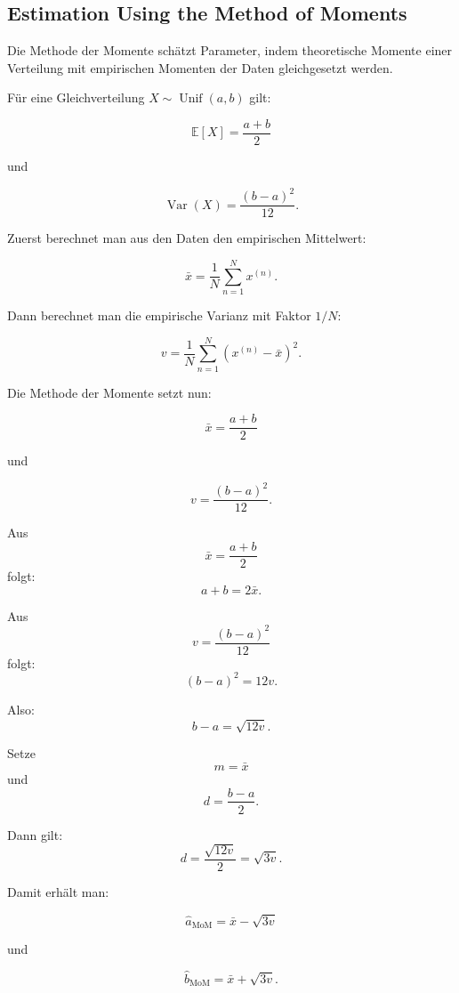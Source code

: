 \documentclass[11pt,a4paper]{scrartcl}
\begin{document}
\subsection{Estimation Using the Method of Moments}

\begin{notebox}
    Die Methode der Momente schätzt Parameter, indem theoretische Momente einer
    Verteilung mit empirischen Momenten der Daten gleichgesetzt werden.

    Für eine Gleichverteilung \(X \sim \operatorname{Unif}(a,b)\) gilt:

    \[
        \mathbb{E}[X]
        =
        \frac{a+b}{2}
    \]

    und

    \[
        \operatorname{Var}(X)
        =
        \frac{(b-a)^2}{12}.
    \]
\end{notebox}

\begin{calculationbox}
    Zuerst berechnet man aus den Daten den empirischen Mittelwert:

    \[
        \bar x
        =
        \frac{1}{N}
        \sum_{n=1}^{N} x^{(n)}.
    \]

    Dann berechnet man die empirische Varianz mit Faktor \(1/N\):

    \[
        v
        =
        \frac{1}{N}
        \sum_{n=1}^{N}
        \left(x^{(n)}-\bar x\right)^2.
    \]

    Die Methode der Momente setzt nun:

    \[
        \bar x
        =
        \frac{a+b}{2}
    \]

    und

    \[
        v
        =
        \frac{(b-a)^2}{12}.
    \]
\end{calculationbox}

\begin{calculationbox}
    Aus
    \[
        \bar x
        =
        \frac{a+b}{2}
    \]
    folgt:
    \[
        a+b
        =
        2\bar x.
    \]

    Aus
    \[
        v
        =
        \frac{(b-a)^2}{12}
    \]
    folgt:
    \[
        (b-a)^2
        =
        12v.
    \]

    Also:
    \[
        b-a
        =
        \sqrt{12v}.
    \]

    Setze
    \[
        m = \bar x
    \]
    und
    \[
        d = \frac{b-a}{2}.
    \]

    Dann gilt:
    \[
        d
        =
        \frac{\sqrt{12v}}{2}
        =
        \sqrt{3v}.
    \]

    Damit erhält man:

    \[
        \hat a_{\mathrm{MoM}}
        =
        \bar x - \sqrt{3v}
    \]

    und

    \[
        \hat b_{\mathrm{MoM}}
        =
        \bar x + \sqrt{3v}.
    \]
\end{calculationbox}
\end{document}
